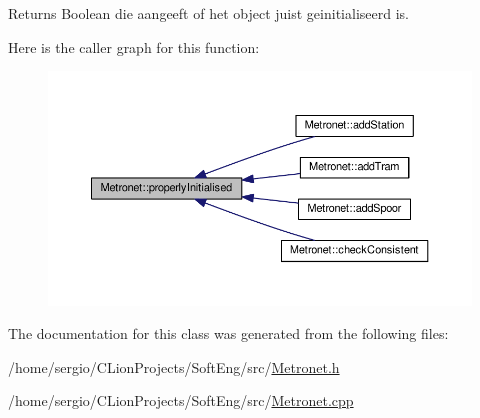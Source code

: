\begin{DoxyReturn}{Returns}
Boolean die aangeeft of het object juist geinitialiseerd is. 
\end{DoxyReturn}
Here is the caller graph for this function\+:
\nopagebreak
\begin{figure}[H]
\begin{center}
\leavevmode
\includegraphics[width=350pt]{class_metronet_a3d2adce29a947f162924279b766de645_icgraph}
\end{center}
\end{figure}


The documentation for this class was generated from the following files\+:\begin{DoxyCompactItemize}
\item 
/home/sergio/\+C\+Lion\+Projects/\+Soft\+Eng/src/\hyperlink{_metronet_8h}{Metronet.\+h}\item 
/home/sergio/\+C\+Lion\+Projects/\+Soft\+Eng/src/\hyperlink{_metronet_8cpp}{Metronet.\+cpp}\end{DoxyCompactItemize}
